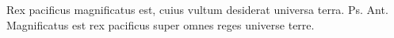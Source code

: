 \begin{multicols*}{2}
{\color{Red} }
\par {} Rex pacificus magnificatus est, cuius vultum desiderat universa terra. {\color{Red} Ps.}  {\color{Red} Ant.} Magnificatus est rex pacificus super omnes reges universe terre.












\end{multicols*}